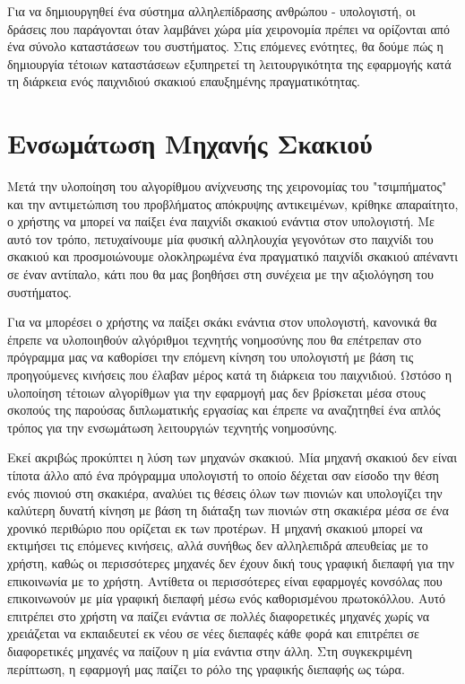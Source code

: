 Για να δημιουργηθεί ένα σύστημα αλληλεπίδρασης ανθρώπου - υπολογιστή, οι δράσεις που παράγονται όταν λαμβάνει χώρα μία χειρονομία πρέπει να ορίζονται από ένα σύνολο καταστάσεων του συστήματος. Στις επόμενες ενότητες, θα δούμε πώς η δημιουργία τέτοιων καταστάσεων εξυπηρετεί τη λειτουργικότητα της εφαρμογής κατά τη διάρκεια ενός παιχνιδιού σκακιού επαυξημένης πραγματικότητας.





\section{Ενσωμάτωση Μηχανής Σκακιού}

Μετά την υλοποίηση του αλγορίθμου ανίχνευσης της χειρονομίας του "τσιμπήματος" και την αντιμετώπιση του προβλήματος απόκρυψης αντικειμένων, κρίθηκε απαραίτητο, ο χρήστης να μπορεί να παίξει ένα παιχνίδι σκακιού ενάντια στον υπολογιστή. Με αυτό τον τρόπο, πετυχαίνουμε μία φυσική αλληλουχία γεγονότων στο παιχνίδι του σκακιού και προσμοιώνουμε ολοκληρωμένα ένα πραγματικό παιχνίδι σκακιού απέναντι σε έναν αντίπαλο, κάτι που θα μας βοηθήσει στη συνέχεια με την αξιολόγηση του συστήματος. 


Για να μπορέσει ο χρήστης να παίξει σκάκι ενάντια στον υπολογιστή, κανονικά θα έπρεπε να υλοποιηθούν αλγόριθμοι τεχνητής νοημοσύνης που θα επέτρεπαν στο πρόγραμμα μας να καθορίσει την επόμενη κίνηση του υπολογιστή με βάση τις προηγούμενες κινήσεις που έλαβαν μέρος κατά τη διάρκεια του παιχνιδιού. Ωστόσο η υλοποίηση τέτοιων αλγορίθμων για την εφαρμογή μας δεν βρίσκεται μέσα στους σκοπούς της παρούσας διπλωματικής εργασίας και έπρεπε να αναζητηθεί ένα απλός τρόπος για την ενσωμάτωση λειτουργιών τεχνητής νοημοσύνης. 


Εκεί ακριβώς προκύπτει η λύση των μηχανών σκακιού. Μία μηχανή σκακιού δεν είναι τίποτα άλλο από ένα πρόγραμμα υπολογιστή το οποίο δέχεται σαν είσοδο την θέση ενός πιονιού στη σκακιέρα, αναλύει τις θέσεις όλων των πιονιών και υπολογίζει την καλύτερη δυνατή κίνηση με βάση τη διάταξη των πιονιών στη σκακιέρα μέσα σε ένα χρονικό περιθώριο που ορίζεται εκ των προτέρων. Η μηχανή σκακιού μπορεί να εκτιμήσει τις επόμενες κινήσεις, αλλά συνήθως δεν αλληλεπιδρά απευθείας με το χρήστη, καθώς οι περισσότερες μηχανές δεν έχουν δική τους γραφική διεπαφή για την επικοινωνία με το χρήστη. Αντίθετα οι περισσότερες είναι εφαρμογές κονσόλας που επικοινωνούν με μία γραφική διεπαφή μέσω ενός καθορισμένου πρωτοκόλλου. Αυτό επιτρέπει στο χρήστη να παίζει ενάντια σε πολλές διαφορετικές μηχανές χωρίς να χρειάζεται να εκπαιδευτεί εκ νέου σε νέες διεπαφές κάθε φορά και επιτρέπει σε διαφορετικές μηχανές να παίζουν η μία ενάντια στην άλλη. Στη συγκεκριμένη περίπτωση, η εφαρμογή μας παίζει το ρόλο της γραφικής διεπαφής ως τώρα. 


